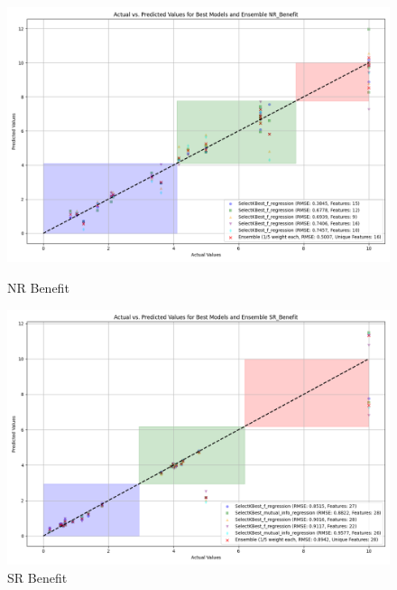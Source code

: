 \begin{figure}[H]
    \centering
    \begin{minipage}{0.45\textwidth}
        \centering
        \includegraphics[width=\linewidth]{reg_section_specxtra/images_reg_featred_ensemble/actual_vs_predicted_best_feature_selection_and_ensemble_NR_Benefit.png}
        \caption{NR Benefit}
        \label{fig_reg_specxtra:nr_ben_reg_featred_best_ensemble}
    \end{minipage}\hfill
    \begin{minipage}{0.45\textwidth}
        \centering
        \includegraphics[width=\linewidth]{reg_section_specxtra/images_reg_featred_ensemble/actual_vs_predicted_best_feature_selection_and_ensemble_SR_Benefit.png}
        \caption{SR Benefit}
        \label{fig_reg_specxtra:sr_ben_reg_featred_best_ensemble}
    \end{minipage}
\end{figure}


